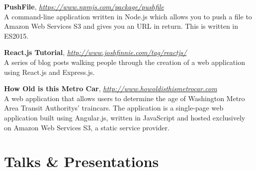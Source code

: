 \documentclass[margin,line,10pt]{resume}
\begin{document}
\begin{resume}
\textbf{PushFile}, \textsl{\href{https://www.npmjs.com/package/pushfile}{https://www.npmjs.com/package/pushfile}}\\
A command-line application written in Node.js which allows you to push a file to Amazon Web Services S3 and gives you
an URL in return. This is written in ES2015.

\textbf{React.js Tutorial}, \textsl{\href{http://www.joshfinnie.com/tag/reactjs/}{http://www.joshfinnie.com/tag/reactjs/}}\\
A series of blog posts walking people through the creation of a web application using React.js and Express.js. 

\textbf{How Old is this Metro Car}, \textsl{\href{http://www.howoldisthismetrocar.com}{http://www.howoldisthismetrocar.com}}\\
A web application that allows users to determine  the age of   Washington Metro Area Transit Authoritys’ traincars. The
application is  a single-page web application   built using Angular.js, written in JavaScript  and hosted exclusively on
Amazon Web Services  S3, a static service provider. 

\section{\mysidestyle Talks \& Presentations\\\vspace{5pt}}


\end{resume}
\end{document}
